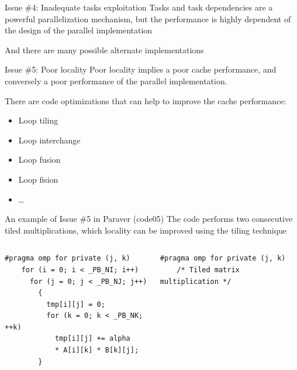 \documentclass[10pt,xcolor=table]{beamer}
\begin{document}
\begin{frame}{Issue \#4: Inadequate tasks exploitation}
Tasks and task dependencies are a powerful parallelization mechanism, but the performance is highly dependent of the design of the parallel implementation

And there are many possible alternate implementations
\end{frame}

\begin{frame}{Issue \#5: Poor locality}
Poor locality implies a poor cache performance, and conversely a poor performance of the parallel implementation. 

There are code optimizations that can help to improve the cache performance:
\begin{itemize}
    \item Loop tiling
    \item Loop interchange
    \item Loop fusion
    \item Loop fision
    \item \ldots
\end{itemize}
\end{frame}

\begin{frame}[fragile]{An example of Issue \#5 in Paraver (code05)}
The code performs two consecutive tiled multiplications, which locality can be improved using the tiling technique
\begin{columns}
\begin{column}{0.5\textwidth}
\begin{lstlisting}[style=shell,basicstyle=\scriptsize\ttfamily,gobble=3,caption={Regular matrix multiplication}]
    #pragma omp for private (j, k)
    for (i = 0; i < _PB_NI; i++)
      for (j = 0; j < _PB_NJ; j++)
        {
          tmp[i][j] = 0;
          for (k = 0; k < _PB_NK; ++k)
            tmp[i][j] += alpha 
            * A[i][k] * B[k][j];
        }

  \end{lstlisting}
  \end{column}
\begin{column}{0.5\textwidth}
  \begin{lstlisting}[style=shell,gobble=3,basicstyle=\scriptsize\ttfamily,caption={Tiled matrix multiplication}]
    #pragma omp for private (j, k)
    /* Tiled matrix multiplication */
  \end{lstlisting}
  \end{column}
  \end{columns}
\end{frame}
\end{document}
